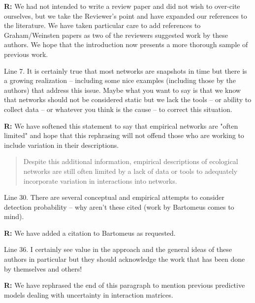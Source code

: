 \documentclass[12pt]{letter}
\newenvironment{refquote}{\bigskip \begin{it}}{\end{it}\smallskip}
\begin{document}
		\textbf{R:} We had not intended to write a review paper and did not wish to over-cite ourselves, but we take the Reviewer's point and have expanded our references to the literature. We have taken particular care to add references to Graham/Weinsten papers as two of the reviewers suggested work by these authors. We hope that the introduction now presents a more thorough sample of previous work.

		\begin{refquote}
		Line 7.  It is certainly true that most networks are snapshots in time but there is a growing realization – including some nice examples (including those by the authors) that address this issue.  Maybe what you want to say is that we know that networks should not be considered static but we lack the tools – or ability to collect data – or whatever you think is the cause – to correct this situation. 
		\end{refquote}

		\textbf{R:} We have softened this statement to say that empirical networks are "often limited" and hope that this rephrasing will not offend those who are working to include variation in their descriptions.

			\begin{quotation}
				Despite this additional information, empirical descriptions of ecological networks are still often limited by a lack of data or tools to adequately incorporate variation in interactions into networks.
			\end{quotation}


		\begin{refquote}
		Line 30.  There are several conceptual and empirical attempts to consider detection probability – why aren’t these cited (work by Bartomeus comes to mind).\\
		\end{refquote}

			\textbf{R:} We have added a citation to Bartomeus as requested.

		\begin{refquote}
			Line 36.  I certainly see value in the approach and the general ideas of these authors in particular but they should acknowledge the work that has been done by themselves and others!\\
		\end{refquote}

		\textbf{R:} We have rephrased the end of this paragraph to mention previous predictive models dealing with uncertainty in interaction matrices.
\end{document}
